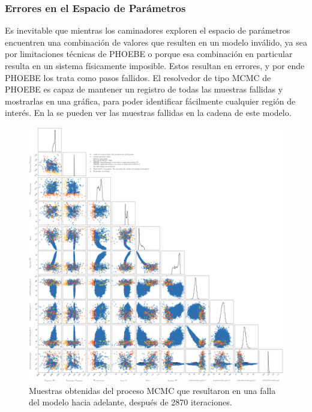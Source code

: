 \subsubsection{Errores en el Espacio de Parámetros}

Es inevitable que mientras los caminadores exploren el espacio de parámetros
encuentren una combinación de valores que resulten en un modelo inválido, ya sea
por limitaciones técnicas de PHOEBE o porque esa combinación en particular
resulta en un sistema físicamente imposible. Estos resultan en errores, y por
ende PHOEBE los trata como pasos fallidos. El resolvedor de tipo MCMC de PHOEBE
es capaz de mantener un registro de todas las muestras fallidas y mostrarlas en
una gráfica, para poder identificar fácilmente cualquier región de interés. En
la  se pueden ver las muestras
fallidas en la cadena de este modelo.

\begin{figure}[!ht]
	\centering
	\includegraphics[scale=0.26]{Metodologia/Secciones/ModeloComputacional/Figures/Figura MCMC Failed.png}
	\caption{Muestras obtenidas del proceso MCMC que resultaron en una falla del modelo hacia adelante, después de 2870 iteraciones.}
	\label{figuraMcmcMuestrasFallidas}
\end{figure}

